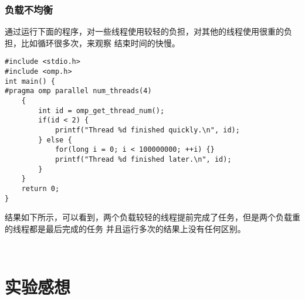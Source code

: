 \documentclass{article}
\begin{document}
\subsubsection{负载不均衡}
通过运行下面的程序，对一些线程使用较轻的负担，对其他的线程使用很重的负担，比如循环很多次，来观察
结束时间的快慢。
\begin{lstlisting}[style=cstyle,caption={负载不均衡}]
#include <stdio.h>
#include <omp.h>
int main() {
#pragma omp parallel num_threads(4)
    {
        int id = omp_get_thread_num();
        if(id < 2) {
            printf("Thread %d finished quickly.\n", id);
        } else {
            for(long i = 0; i < 100000000; ++i) {}
            printf("Thread %d finished later.\n", id);
        }
    }
    return 0;
}
\end{lstlisting}
结果如下所示，可以看到，两个负载较轻的线程提前完成了任务，但是两个负载重的线程都是最后完成的任务
并且运行多次的结果上没有任何区别。
\begin{lstlisting}[style=bashstyle,]
    
\end{lstlisting}
\section{实验感想}
\newpage
\appendix
\end{document}
